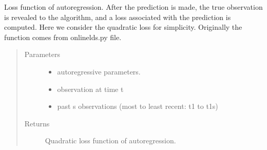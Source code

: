 \documentclass[letterpaper,10pt,english]{sphinxmanual}
\begin{document}
\begin{fulllineitems}
\label{\detokenize{LDS:LDS.OnlineLDS_library.cost_ar}}
\sphinxAtStartPar
Loss function of auto\sphinxhyphen{}regression.
After the prediction is made, the true observation is revealed to
the algorithm, and a loss associated with the prediction is computed.
Here we consider the quadratic loss for simplicity.
Originally the function comes from onlinelds.py file.
\begin{quote}\begin{description}
\item[{Parameters}] \leavevmode\begin{itemize}
\item {} 
\sphinxAtStartPar
{} \textendash{} auto\sphinxhyphen{}regressive parameters.

\item {} 
\sphinxAtStartPar
{}\sphinxstyleliteralstrong{\sphinxupquote{{[}}}\sphinxstyleliteralstrong{\sphinxupquote{{]}}} \textendash{} observation at time t

\item {} 
\sphinxAtStartPar
{}\sphinxstyleliteralstrong{\sphinxupquote{{[}}}\sphinxstyleliteralstrong{\sphinxupquote{{]}}} \textendash{} past s observations (most to least recent: t\sphinxhyphen{}1 to t\sphinxhyphen{}1\sphinxhyphen{}s)

\end{itemize}

\item[{Returns}] \leavevmode
\sphinxAtStartPar
Quadratic loss function of auto\sphinxhyphen{}regression.

\end{description}\end{quote}

\end{fulllineitems}

\end{document}
